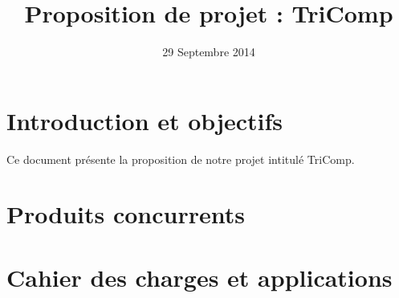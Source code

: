\documentclass{article}
\title{Proposition de projet : TriComp}
\author{}
\date{29 Septembre 2014}
\begin{document}
\maketitle
\pagebreak

%

%



\section{Introduction et objectifs}

Ce document présente la proposition de notre projet intitulé TriComp.

\section{Produits concurrents}

\section{Cahier des charges et applications}
\end{document}
